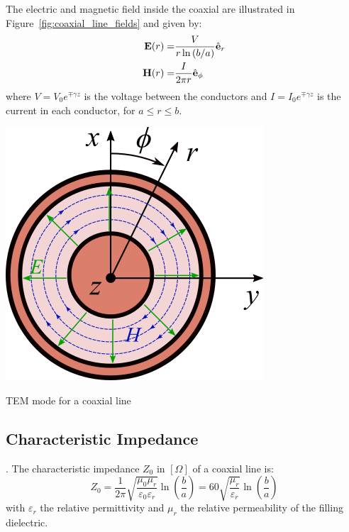 The electric and magnetic field inside the coaxial are illustrated in Figure~\ref{fig:coaxial_line_fields} and given by:
\begin{subequations}
	\begin{align}
		{\mathbf E}(r) =& \frac{V}{r \ln \left(b/a \right)} \hat{{\mathbf e}}_r \label{eq:coaxial_electric_field}\\
		{\mathbf H}(r) =& \frac{I}{2\pi r} \hat{{\mathbf e}}_\phi \label{eq:coaxial_magnetic_field}
	\end{align}
	
\end{subequations}
where $V=V_0 e^{\mp\gamma z}$ is the voltage between the conductors and $I=I_0 e^{\mp\gamma z}$ is the current in each conductor, for $a\leqslant r \leqslant b$. 

\begin{marginfigure}[*-8]
	\includegraphics[width=.8\linewidth]{figures/chap3/coaxial_fields}
	\caption{TEM mode for a coaxial line}
	\label{fig:coaxial_line_fields}
\end{marginfigure}	

\subsection{Characteristic Impedance}. 
The characteristic impedance $Z_0$ in $[\si{\Omega}]$ of a coaxial line is:
\begin{equation}
Z_0 = 
	\frac{1}{2\pi} \sqrt{\frac{\mu_0 \mu_r}{\varepsilon_{0} \varepsilon_{r}}} \ln\left( \frac{b}{a} \right)
	=
	60 \sqrt{\frac{\mu_r}{\varepsilon_{r}}} \ln\left( \frac{b}{a} \right) 
\end{equation}
with $\varepsilon_{r}$ the relative permittivity and $\mu_r$ the relative permeability of the filling dielectric. 

